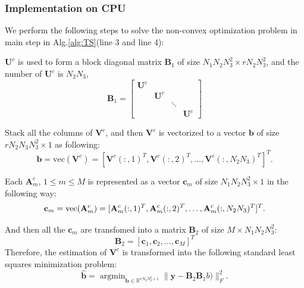 \documentclass[futureinternet,article,submit,moreauthors,pdftex,10pt,a4paper]{Definitions/mdpi}
\theoremstyle{plain}
\theoremstyle{definition}
\theoremstyle{remark}
\begin{document}
\subsubsection{Implementation on CPU}
We perform the following steps to solve the non-convex optimization problem in main step in Alg.\ref{alg:TS}(line 3 and line 4):
\begin{steps}
\item $\mathbf{U}^c$ is used to form a block diagonal matrix $\mathbf{B}_1$ of size $N_1N_2N^2_3 \times rN_2N^2_3$, and the number of $\mathbf{U}^c$ is $N_2N_3$,
    \begin{equation}
        \label{eqa:diag}
        \mathbf{B}_1 = 
        \begin{bmatrix}
            \mathbf{U}^c & & & \\
            & \mathbf{U}^c & & \\
            & & \ddots & \\
            & & & \mathbf{U}^c
        \end{bmatrix}
    \end{equation}
\item Stack all the columns of $\mathbf{V}^c$, and then $\mathbf{V}^c$ is vectorized to a vector $\mathbf{b}$ of size $rN_2N_3N^2_3 \times 1$ as following:
    \begin{equation}
        \mathbf{b} = \text{vec}(\mathbf{V}^c) =[\mathbf{V}^c(:,1)^T, \mathbf{V}^c(:,2)^T, \dots, \mathbf{V}^c(:,N_2N_3)^T]^T. 
    \end{equation}

\item Each $\mathbf{A}^c_m$, $1 \leq m \leq M$ is represented as a vector $\mathbf{c}_m$ of size $N_1N_2N^2_3 \times 1$ in the following way:
    \begin{equation}
        \mathbf{c}_m = \text{vec}(\mathbf{A}^c_m) \\
        =[\mathbf{A}^c_m(:,1)^T, \mathbf{A}^c_m(:,2)^T, \dots, \mathbf{A}^c_m(:,N_2N_3)^T]^T.
    \end{equation}

    And then all the $\mathbf{c}_m$ are transfomed into a matrix $\mathbf{B}_2$ of size $M \times N_1N_2N^2_3$:
    \begin{equation}
        \mathbf{B}_2 = [\mathbf{c}_1, \mathbf{c}_2, \dots, \mathbf{c}_M]^T
    \end{equation}
    Therefore, the estimation of $\mathbf{V}^c$ is transformed into the following standard least squares minimization problem:
        \begin{equation}
            \label{eqa:lsm}
            \widehat{\mathbf{b}} =
            \mathop{\arg\min}_{ \mathbf{b} \in \mathbb{R}^{rN_2N^2_3 \times 1}} \| \mathbf{y} - \mathbf{B}_2\mathbf{B}_1b) \|_F^2 .
        \end{equation}

\end{steps}
\end{document}
